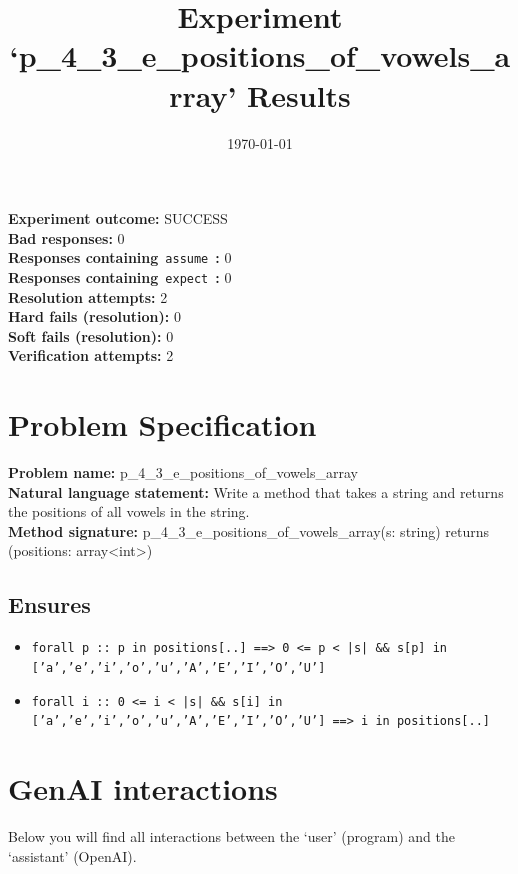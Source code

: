 \documentclass{article}
\begin{document}
\title{Experiment `p\_4\_3\_e\_positions\_of\_vowels\_array' Results}
\author{\today}
\date{}
\maketitle
\textbf{Experiment outcome: }SUCCESS
\\\textbf{Bad responses: }0
\\\textbf{Responses containing}~\texttt{assume}~\textbf{: }0
\\\textbf{Responses containing}~\texttt{expect}~\textbf{: }0
\\\textbf{Resolution attempts: }2
\\\textbf{Hard fails (resolution): }0
\\\textbf{Soft fails (resolution): }0
\\\textbf{Verification attempts: }2
\section*{Problem Specification}
\textbf{Problem name: }p\_4\_3\_e\_positions\_of\_vowels\_array
\\\textbf{Natural language statement: }Write a method that takes a string and returns the positions of all vowels in the string.
\\\textbf{Method signature: }p\_4\_3\_e\_positions\_of\_vowels\_array(s: string) returns (positions: array<int>)
\subsection*{Ensures}
\begin{itemize}
\item \texttt{forall p :: p in positions[..] ==> 0 <= p < |s| \&\& s[p] in ['a','e','i','o','u','A','E','I','O','U']}
\item \texttt{forall i :: 0 <= i < |s| \&\& s[i] in ['a','e','i','o','u','A','E','I','O','U'] ==> i in positions[..]}
\end{itemize}
\clearpage
\section*{GenAI interactions}
Below you will find all interactions between the `user' (program) and the `assistant' (OpenAI).
\end{document}
